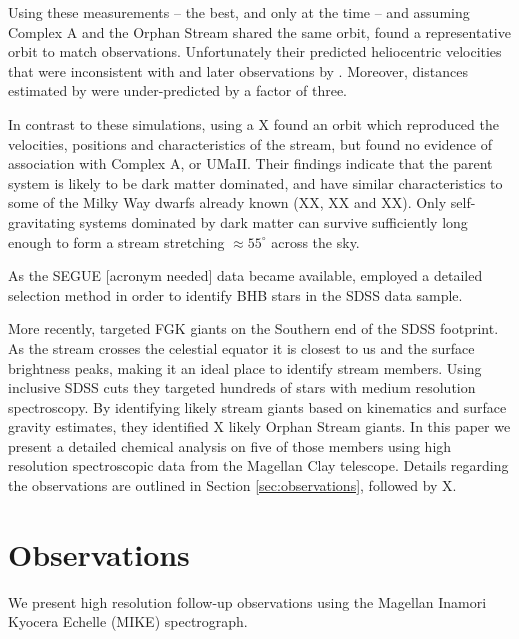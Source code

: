 \documentclass{emulateapj}
\begin{document}

Using these measurements \--- the best, and only at the time \--- and assuming Complex A and the Orphan Stream shared the same orbit, \citet{Jin;Lynden-Bell_2007} found a representative orbit to match observations. Unfortunately their predicted heliocentric velocities that were inconsistent with \citet{Fellhaur;et-al_2007} and later observations by \citet{Newberg;et-al_2010}. Moreover, distances estimated by \citet{Jin;Lynden-Bell_2007} were under-predicted by a factor of three.



In contrast to these simulations, \citet{Sales;et-al_2007} using a X found an orbit which reproduced the velocities, positions and characteristics of the stream, but found no evidence of association with Complex A, or UMaII. 
Their findings indicate that the parent system is likely to be dark matter dominated, and have similar characteristics to some of the Milky Way dwarfs already known (XX, XX and XX). Only self-gravitating systems dominated by dark matter can survive sufficiently long enough to form a stream stretching $\approx55^\circ$ across the sky. 


As the SEGUE [acronym needed] data became available, \citet{Newberg;et-al_2010} employed a detailed selection method in order to identify BHB stars in the SDSS data sample.


More recently, \citet{Keller;et-al_2012} targeted FGK giants on the Southern end of the SDSS footprint. As the stream crosses the celestial equator it is closest to us and the surface brightness peaks, making it an ideal place to identify stream members. Using inclusive SDSS cuts they targeted hundreds of stars with medium resolution spectroscopy. By identifying likely stream giants based on kinematics and surface gravity estimates, they identified X likely Orphan Stream giants. In this paper we present a detailed chemical analysis on five of those members using high resolution spectroscopic data from the Magellan Clay telescope. Details regarding the observations are outlined in Section \ref{sec:observations}, followed by X.

\section{Observations}
We present high resolution follow-up observations using the Magellan Inamori Kyocera Echelle (MIKE) spectrograph.
\end{document}

